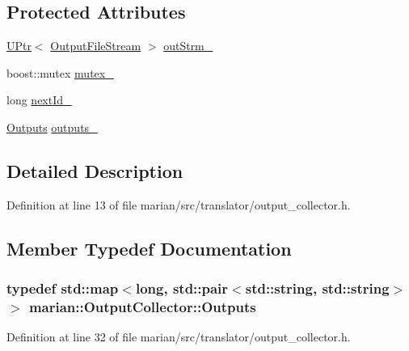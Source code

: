 \subsection*{Protected Attributes}
\begin{DoxyCompactItemize}
\item 
\hyperlink{namespacemarian_aef1c1bbe14b70285b1e8f7653f134cb1}{U\+Ptr}$<$ \hyperlink{classOutputFileStream}{Output\+File\+Stream} $>$ \hyperlink{classmarian_1_1OutputCollector_a09fede155203845f26bf55be5d38e009}{out\+Strm\+\_\+}
\item 
boost\+::mutex \hyperlink{classmarian_1_1OutputCollector_acded8bfaafbb69d10e32a4b38263e08b}{mutex\+\_\+}
\item 
long \hyperlink{classmarian_1_1OutputCollector_a0d936e88142afee4f490f6f39a66b792}{next\+Id\+\_\+}
\item 
\hyperlink{classmarian_1_1OutputCollector_a63097e38c39a83640b903e546aa3cbb8}{Outputs} \hyperlink{classmarian_1_1OutputCollector_a58dc9b7a62760be77669cd7ad612668e}{outputs\+\_\+}
\end{DoxyCompactItemize}


\subsection{Detailed Description}


Definition at line 13 of file marian/src/translator/output\+\_\+collector.\+h.



\subsection{Member Typedef Documentation}
\subsubsection[{\texorpdfstring{Outputs}{Outputs}}]{\setlength{\rightskip}{0pt plus 5cm}typedef std\+::map$<$long, std\+::pair$<$std\+::string, std\+::string$>$ $>$ {\bf marian\+::\+Output\+Collector\+::\+Outputs}\hspace{0.3cm}{\ttfamily [protected]}}\hypertarget{classmarian_1_1OutputCollector_a63097e38c39a83640b903e546aa3cbb8}{}\label{classmarian_1_1OutputCollector_a63097e38c39a83640b903e546aa3cbb8}


Definition at line 32 of file marian/src/translator/output\+\_\+collector.\+h.



